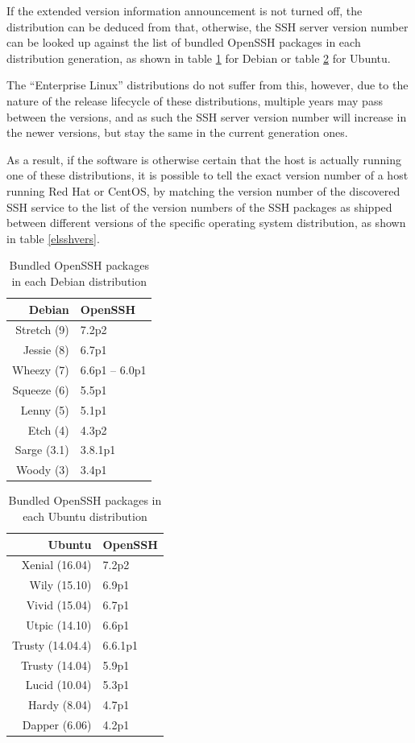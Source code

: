 \documentclass[a4paper,12pt]{article}
\begin{document}
	If the extended version information announcement is not turned off, the distribution can be deduced from that, otherwise, the SSH server version number can be looked up against the list of bundled OpenSSH packages in each distribution generation, as shown in table \ref{debsshvers} for Debian or table \ref{ubnsshvers} for Ubuntu.
	
	The ``Enterprise Linux'' distributions do not suffer from this, however, due to the nature of the release lifecycle of these distributions, multiple years may pass between the versions, and as such the SSH server version number will increase in the newer versions, but stay the same in the current generation ones.
	
	As a result, if the software is otherwise certain that the host is actually running one of these distributions, it is possible to tell the exact version number of a host running Red Hat or CentOS, by matching the version number of the discovered SSH service to the list of the version numbers of the SSH packages as shipped between different versions of the specific operating system distribution, as shown in table \ref{elsshvers}.
	
	\begin{table}[H]
		\centering
		\begin{tabular}{|rl|}
			\hline
			\textbf{Debian} & \textbf{OpenSSH} \\ \hline
			Stretch (9) & 7.2p2 \\
			Jessie (8) & 6.7p1 \\
			Wheezy (7) & 6.6p1 -- 6.0p1 \\
			Squeeze (6) & 5.5p1 \\
			Lenny (5) & 5.1p1 \\
			Etch (4) & 4.3p2 \\
			Sarge (3.1) & 3.8.1p1 \\
			Woody (3) & 3.4p1 \\ \hline
		\end{tabular}
		\caption{Bundled OpenSSH packages in each Debian distribution}
		\label{debsshvers}
	\end{table}
		
	\begin{table}[H]
		\centering
		\begin{tabular}{|rl|}
			\hline
			\textbf{Ubuntu} & \textbf{OpenSSH} \\ \hline
			Xenial (16.04) & 7.2p2 \\
			Wily (15.10) & 6.9p1 \\
			Vivid (15.04) & 6.7p1 \\
			Utpic (14.10) & 6.6p1 \\
			Trusty (14.04.4) & 6.6.1p1 \\
			Trusty (14.04) & 5.9p1 \\
			Lucid (10.04) & 5.3p1 \\
			Hardy (8.04) & 4.7p1 \\
			Dapper (6.06) & 4.2p1 \\ \hline
		\end{tabular}
		\caption{Bundled OpenSSH packages in each Ubuntu distribution}
		\label{ubnsshvers}
	\end{table}
			
\end{document}
